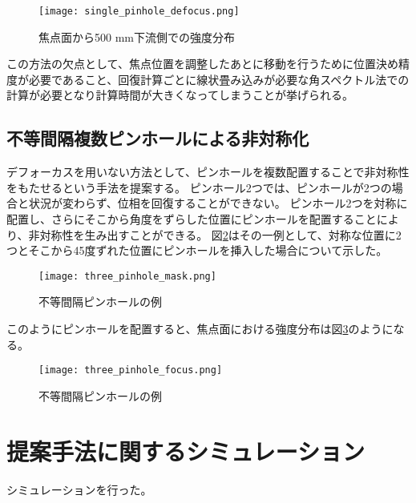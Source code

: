 \begin{figure}[!ht]
\centering
\texttt{[image: single\_pinhole\_defocus.png]}
\caption{焦点面から500 mm下流側での強度分布}
\label{fig:single_pinhole_defocus}
\end{figure}

この方法の欠点として、焦点位置を調整したあとに移動を行うために位置決め精度が必要であること、回復計算ごとに線状畳み込みが必要な角スペクトル法での計算が必要となり計算時間が大きくなってしまうことが挙げられる。

\subsection{不等間隔複数ピンホールによる非対称化}
デフォーカスを用いない方法として、ピンホールを複数配置することで非対称性をもたせるという手法を提案する。
ピンホール2つでは、ピンホールが2つの場合と状況が変わらず、位相を回復することができない。
ピンホール2つを対称に配置し、さらにそこから角度をずらした位置にピンホールを配置することにより、非対称性を生み出すことができる。
図\ref{fig:three_pinhole_mask}はその一例として、対称な位置に2つとそこから45度ずれた位置にピンホールを挿入した場合について示した。

\begin{figure}[!ht]
\centering
\texttt{[image: three\_pinhole\_mask.png]}
\caption{不等間隔ピンホールの例}
\label{fig:three_pinhole_mask}
\end{figure}

このようにピンホールを配置すると、焦点面における強度分布は図\ref{fig:three_pinhole_focus}のようになる。

\begin{figure}[!ht]
\centering
\texttt{[image: three\_pinhole\_focus.png]}
\caption{不等間隔ピンホールの例}
\label{fig:three_pinhole_focus}
\end{figure}


\clearpage
\newpage

\section{提案手法に関するシミュレーション}
\label{chap3_transverse_simulation}
シミュレーションを行った。

\clearpage
\newpage

